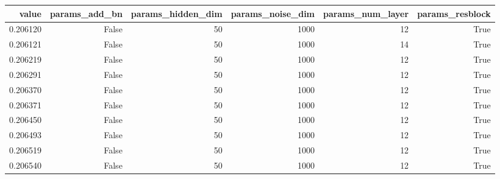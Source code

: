 \begin{tabular}{rrrrrr}
\toprule
value & params_add_bn & params_hidden_dim & params_noise_dim & params_num_layer & params_resblock \\
\midrule
0.206120 & False & 50 & 1000 & 12 & True \\
0.206121 & False & 50 & 1000 & 14 & True \\
0.206219 & False & 50 & 1000 & 12 & True \\
0.206291 & False & 50 & 1000 & 12 & True \\
0.206370 & False & 50 & 1000 & 12 & True \\
0.206371 & False & 50 & 1000 & 12 & True \\
0.206450 & False & 50 & 1000 & 12 & True \\
0.206493 & False & 50 & 1000 & 12 & True \\
0.206519 & False & 50 & 1000 & 12 & True \\
0.206540 & False & 50 & 1000 & 12 & True \\
\bottomrule
\end{tabular}
